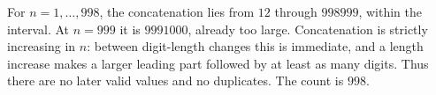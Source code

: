 For $n=1,\ldots,998$, the concatenation lies from $12$ through $998999$, within the interval. At $n=999$ it is $9991000$, already too large. Concatenation is strictly increasing in $n$: between digit-length changes this is immediate, and a length increase makes a larger leading part followed by at least as many digits. Thus there are no later valid values and no duplicates. The count is $\boxed{998}$.
